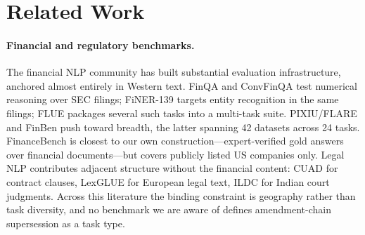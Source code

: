 
\section{Related Work}
\label{sec:related}

\paragraph{Financial and regulatory benchmarks.}
The financial NLP community has built substantial evaluation infrastructure, anchored almost
entirely in Western text. FinQA \citep{chen2021finqa} and ConvFinQA \citep{zheng2022convfinqa} test
numerical reasoning over SEC filings; FiNER-139 \citep{loukas2022finer} targets entity recognition
in the same filings; FLUE \citep{shah2022flue} packages several such tasks into a multi-task suite.
PIXIU/FLARE \citep{xie2023pixiu} and FinBen \citep{xie2024finben} push toward breadth, the latter
spanning 42 datasets across 24 tasks. FinanceBench \citep{islam2023financebench} is closest to our
own construction---expert-verified gold answers over financial documents---but covers publicly
listed US companies only. Legal NLP contributes adjacent structure without the financial content:
CUAD \citep{hendrycks2021cuad} for contract clauses, LexGLUE \citep{chalkidis2022lexglue} for
European legal text, ILDC \citep{malik2021ildc} for Indian court judgments. Across this literature
the binding constraint is geography rather than task diversity, and no benchmark we are aware of
defines amendment-chain supersession as a task type.

